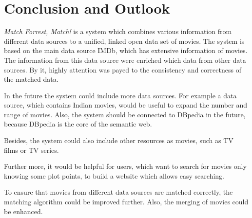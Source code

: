 \section{Conclusion and Outlook}
\label{sec_conclusion}

\emph{Match Forrest, Match!} is a system which combines various information from different data sources to a unified, linked open data set of movies.
The system is based on the main data source IMDb, which has extensive information of movies.
The information from this data source were enriched which data from other data sources.
By it, highly attention was payed to the consistency and correctness of the matched data.

In the future the system could include more data sources.
For example a data source, which contains Indian movies, would be useful to expand the number and range of movies.
Also, the system should be connected to DBpedia in the future, because DBpedia is the core of the semantic web.

Besides, the system could also include other resources as movies, such as TV films or TV series.

Further more, it would be helpful for users, which want to search for movies only knowing some plot points, to build a website which allows easy searching.

To ensure that movies from different data sources are matched correctly, the matching algorithm could be improved further.
Also, the merging of movies could be enhanced.
